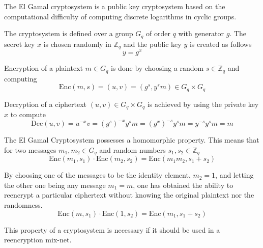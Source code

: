 The El Gamal cryptosystem is a public key cryptosystem based on the
computational difficulty of computing discrete logarithms in cyclic
groups. 

The cryptosystem is defined over a group $G_q$ of order $q$ with
generator $g$. The secret key $x$ is chosen randomly in $\mathbb{Z}_q$
and the public key $y$ is created as follows
$$
y = g^x
$$

Encryption of a plaintext $m \in G_q$ is done by choosing a random $s
\in \mathbb{Z}_q$ and computing
$$
\mathrm{Enc}(m,s) = (u,v) = (g^s, y^sm) \in G_q \times G_q
$$

Decryption of a ciphertext $(u,v) \in G_q \times G_q$ is achieved by
using the private key $x$ to compute
$$ 
\mathrm{Dec}(u,v) = u^{-x}v = (g^s)^{-x}y^sm = (g^x)^{-s}y^sm = y^{-s}y^sm = m
$$

The El Gamal Cryptosystem possesses a homomorphic property. This means
that for two messages $m_1,m_2 \in G_q$ and random numbers $s_1, s_2
\in \mathbb{Z}_q$
$$
\mathrm{Enc}(m_1,s_1) \cdot \mathrm{Enc}(m_2,s_2) = \mathrm{Enc}(m_1m_2,s_1 + s_2)
$$

By choosing one of the messages to be the identity element, $m_2 = 1$,
and letting the other one being any message $m_1 = m$, one has
obtained the ability to reencrypt a particular ciphertext without
knowing the original plaintext nor the randomness. 
$$
\mathrm{Enc}(m,s_1) \cdot \mathrm{Enc}(1,s_2) = \mathrm{Enc}(m_1, s_1 + s_2)
$$

This property of a cryptosystem is necessary if it should be used in a
reencryption mix-net.


